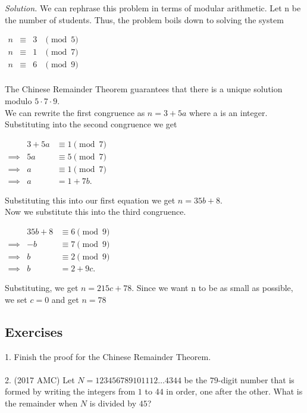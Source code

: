 \documentclass{article}
\begin{document}
\emph{Solution.} We can rephrase this problem in terms of modular arithmetic. Let n be the number of students. Thus, the problem boils down to solving the system
    \begin{center}
        $\begin{array}{rcll}
            n &\equiv &3 &\pmod{5}\\
            n &\equiv &1 &\pmod{7}\\
            n &\equiv &6 &\pmod{9}\\
        \end{array}$
    \end{center}
    The Chinese Remainder Theorem guarantees that there is a unique solution modulo $5\cdot 7 \cdot 9$.\\
    We can rewrite the first congruence as $n = 3 + 5a$ where a is an integer.
    Substituting into the second congruence we get 
    \begin{center}
        $\begin{array}{rrll}
            &3+5a &\equiv 1 \pmod{7} \\
         \implies &5a &\equiv 5 \pmod{7} \\
         \implies &a &\equiv 1 \pmod{7}\\
         \implies &a &= 1 + 7b.
        \end{array}$
    \end{center}
    Substituting this into our first equation we get $n = 35b + 8$. \\
    Now we substitute this into the third congruence.
    \begin{center}
        $\begin{array}{rrll}
            &35b+8 &\equiv 6 \pmod{9} \\
         \implies &-b &\equiv 7 \pmod{9} \\
         \implies &b &\equiv 2 \pmod{9}\\
         \implies &b &= 2 + 9c.
        \end{array}$
    \end{center}
    Substituting, we get $n = 215c + 78$. Since we want n to be as small as possible, we set $c=0$ and get $\boxed{n=78}$
\subsection*{Exercises}
1. Finish the proof for the Chinese Remainder Theorem.\\\\
2. (2017 AMC) Let $N=123456789101112\dots4344$ be the $79$-digit number that is formed by writing the integers from $1$ to $44$ in order, one after the other. What is the remainder when $N$ is divided by $45$?
 
\end{document}
